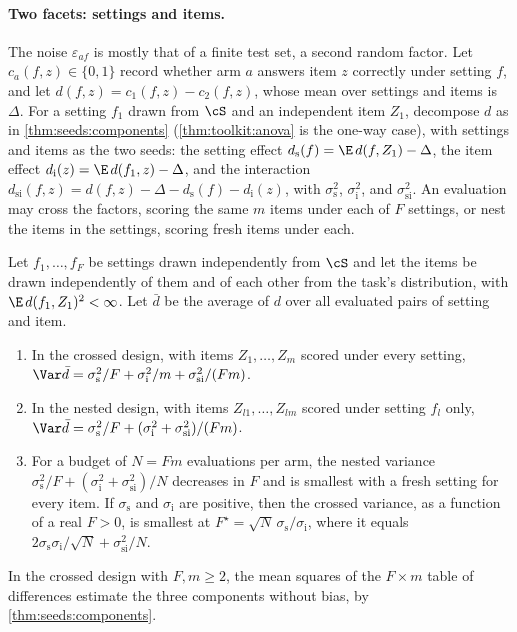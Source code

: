 \begin{refsection}
\paragraph{Two facets: settings and items.} The noise $\varepsilon_{af}$ is mostly that of a finite test set, a second random factor. Let $c_a(f,z)\in\{0,1\}$ record whether arm $a$ answers item $z$ correctly under setting $f$, and let $d(f,z)=c_1(f,z)-c_2(f,z)$, whose mean over settings and items is $\Delta$. For a setting $f_1$ drawn from $\cS$ and an independent item $Z_1$, decompose $d$ as in \cref{thm:seeds:components} (\cref{thm:toolkit:anova} is the one-way case), with settings and items as the two seeds: the setting effect $d_{\mathrm s}(f)=\E\,d(f,Z_1)-\Delta$, the item effect $d_{\mathrm i}(z)=\E\,d(f_1,z)-\Delta$, and the interaction $d_{\mathrm{si}}(f,z)=d(f,z)-\Delta-d_{\mathrm s}(f)-d_{\mathrm i}(z)$, with  $\sigma_{\mathrm s}^2$, $\sigma_{\mathrm i}^2$, and $\sigma_{\mathrm{si}}^2$. An evaluation may cross the factors, scoring the same $m$ items under each of $F$ settings, or nest the items in the settings, scoring fresh items under each.

\begin{proposition}\label{prop:instruments:facets}
Let $f_1,\dots,f_F$ be settings drawn independently from $\cS$ and let the items be drawn independently of them and of each other from the task's distribution, with $\E\,d(f_1,Z_1)^2<\infty$. Let $\bar d$ be the average of $d$ over all evaluated pairs of setting and item.
\begin{enumerate}
\item In the crossed design, with items $Z_1,\dots,Z_m$ scored under every setting, $\Var\bar d=\sigma_{\mathrm s}^2/F+\sigma_{\mathrm i}^2/m+\sigma_{\mathrm{si}}^2/(Fm)$.
\item In the nested design, with items $Z_{l1},\dots,Z_{lm}$ scored under setting $f_l$ only, $\Var\bar d=\sigma_{\mathrm s}^2/F+(\sigma_{\mathrm i}^2+\sigma_{\mathrm{si}}^2)/(Fm)$.
\item For a budget of $N=Fm$ evaluations per arm, the nested variance $\sigma_{\mathrm s}^2/F+(\sigma_{\mathrm i}^2+\sigma_{\mathrm{si}}^2)/N$ decreases in $F$ and is smallest with a fresh setting for every item. If $\sigma_{\mathrm s}$ and $\sigma_{\mathrm i}$ are positive, then the crossed variance, as a function of a real $F>0$, is smallest at $F^\star=\sqrt N\,\sigma_{\mathrm s}/\sigma_{\mathrm i}$, where it equals $2\sigma_{\mathrm s}\sigma_{\mathrm i}/\sqrt N+\sigma_{\mathrm{si}}^2/N$.
\end{enumerate}
In the crossed design with $F,m\ge2$, the mean squares of the $F\times m$ table of differences estimate the three components without bias, by \cref{thm:seeds:components}.
\end{proposition}


\end{refsection}
